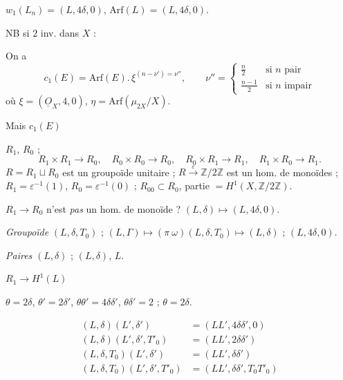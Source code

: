 \documentclass[11pt,a4paper]{article}
\begin{document}
$w_1(L_n) = (L, 4\delta, 0)$, \quad $\mathrm{Arf}(L) = (L, 4\delta, 0)$.

 NB si $2$ inv. dans $X$ : \struck{$\ldots \simeq \ldots$} 

On a
\[
  c_1(E) = \mathrm{Arf}(E).\,\xi^{(n - \nu') = \nu''}, \qquad \nu'' = \begin{cases} \tfrac{n}{2} & \text{si } n \text{ pair} \\ \tfrac{n-1}{2} & \text{si } n \text{ impair} \end{cases}
\]
où $\xi = (\underline{O}_X, 4, 0)$, $\eta = \mathrm{Arf}(\mu_{2X}/X)$.

Mais $c_1(E)$ \ill{}

$R_1$, $R_0$ ;
\[
  R_1 \times R_1 \to R_0, \quad R_0 \times R_0 \to R_0, \quad R_0 \times R_1 \to R_1, \quad R_1 \times R_0 \to R_1 .
\]
$R = R_1 \sqcup R_0$ est un groupoïde unitaire ; \struck{\ill{}} $R \xrightarrow{\varepsilon} \mathbb{Z}/2\mathbb{Z}$ est un hom. de monoïdes ;
$R_1 = \varepsilon^{-1}(1)$, $R_0 = \varepsilon^{-1}(0)$ ; $R_{00} \subset R_0$, partie \ill{} $= H^1(X, \mathbb{Z}/2\mathbb{Z})$.

$R_1 \to R_0$ n'est \emph{pas} un hom. de monoïde ? \quad $(L,\delta) \mapsto (L, 4\delta, 0)$.

\emph{Groupoïde} $(L, \delta, T_0)$ ; $(L,\Gamma) \mapsto (\pi\ \omega)(L, \delta, T_0) \mapsto (L,\delta)$ ; $(L, 4\delta, 0)$.

\emph{Paires} $(L, \delta)$ ; \quad $(L, \delta)$, $L$.

$R_1 \to H^1(L)$

$\theta = 2\delta$, \quad $\theta' = 2\delta'$, \quad $\theta\theta' = 4\delta\delta'$, \quad $\theta\delta' = 2$ ; \quad $\theta = 2\delta$.

\begin{align*}
  (L, \delta)(L', \delta') &= (LL', 4\delta\delta', 0) \\
  (L, \delta)(L', \delta', T'_0) &= (LL', 2\delta\delta') \\
  (L, \delta, T_0)(L', \delta') &= (LL', \delta\delta') \\
  (L, \delta, T_0)(L', \delta', T'_0) &= (LL', \delta\delta', T_0 T'_0)
\end{align*}
\end{document}
